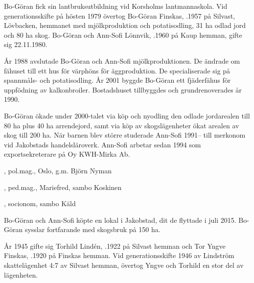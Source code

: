Bo-Göran fick sin lantbruksutbildning vid Korsholms lantmannaskola. Vid generationsskifte på hösten 1979 övertog Bo-Göran Finskas, .1957 på Silvast, Lövbacken, hemmanet med mjölkproduktion och potatisodling, 31 ha odlad jord och 80 ha skog. Bo-Göran och Ann-Sofi Lönnvik, .1960 på Kaup hemman, gifte sig 22.11.1980.

År 1988 avslutade Bo-Göran och Ann-Sofi mjölkproduktionen. De ändrade om fähuset till ett hus för värphöns för äggproduktion. De specialiserade sig på spannmåls- och potatisodling. År 2001 byggde Bo-Göran ett fjäderfähus för uppfödning av kalkonbroiler. Bostadshuset tillbyggdes och grundrenoverades år 1990.

Bo-Göran ökade under 2000-talet via köp och nyodling den odlade jordarealen till 80 ha plus 40 ha arrendejord, samt via köp av skogslägenheter ökat arealen av skog till 200 ha. När 	barnen blev större studerade Ann-Sofi 1991-- till merkonom vid 	Jakobstads handelsläroverk. Ann-Sofi arbetar sedan 1994 som exportsekreterare på Oy KWH-Mirka Ab.
\begin{jhchildren}
  \item {}, pol.mag., Oslo, g.m. Björn Nyman
  \item {}, ped.mag., Mariefred, sambo Koskinen
  \item {}, socionom, sambo Käld
  \item {}
\end{jhchildren}
Bo-Göran och Ann-Sofi köpte en lokal i Jakobstad, dit de flyttade i juli 2015. Bo-Göran sysslar fortfarande med skogsbruk på 150 ha.


År 1945 gifte sig Torhild Lindén, .1922 på Silvast hemman och Tor Yngve Finskas, .1920 på Finskas hemman. Vid generationsskifte 1946 av Lindström skattelägenhet 4:7 av Silvast hemman, övertog Yngve och Torhild en stor del av lägenheten.

